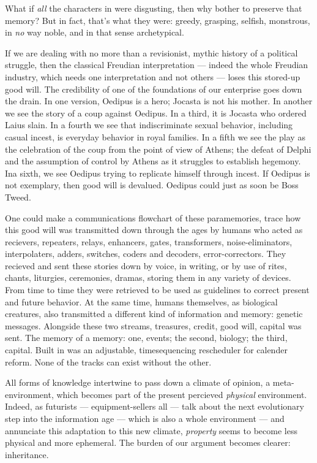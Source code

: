 What if \emph{all} the characters in  were
disgusting, then why bother to preserve that
memory? But in fact, that's what they were:
greedy, grasping, selfish, monstrous, in \emph{no}
way noble, and in that sense archetypical.

If we are dealing with no more than a
revisionist, mythic history of a political
struggle, then the classical Freudian interpretation --- indeed the whole Freudian industry, which needs one interpretation and not others --- loses this stored-up good will.
The credibility of one of the foundations of
our enterprise goes down the drain. In one
version, Oedipus is a hero; Jocasta is not his
mother. In another we see the story of a coup
against Oedipus. In a third, it is Jocasta who
ordered Laius slain. In a fourth we see that
indiscriminate sexual behavior, including
casual incest, is everyday behavior in royal
families. In a fifth we see the play as the
celebration of the coup from the point of
view of Athens; the defeat of Delphi and the
assumption of control by Athens as it struggles to establish hegemony. Ina sixth, we see
Oedipus trying to replicate himself through
incest. If Oedipus is not exemplary, then
good will is devalued. Oedipus could just as
soon be Boss Tweed.

One could make a communications flowchart of these paramemories, trace how this
good will was transmitted down through the
ages by humans who acted as recievers, repeaters, relays, enhancers, gates, transformers, noise-eliminators, interpolaters, adders,
switches, coders and decoders, error-correctors. They recieved
and sent these stories
down by voice, in writing, or by use of rites,
chants, liturgies, ceremonies, dramas, storing them in any variety of devices. From
time to time they were retrieved to be used as
guidelines to correct present and future behavior.
At the same time, humans themselves, as biological creatures, also transmitted a different kind of information and
memory: genetic messages. Alongside these two
streams, treasures, credit, good will, capital was sent. The memory of a memory:
one, events; the second, biology; the third,
capital. Built in was an adjustable, timesequencing rescheduler for calender reform.
None of the tracks can exist without the
other.

All forms of knowledge intertwine to pass
down a climate of opinion, a meta-environment, which becomes part of the present
percieved \emph{physical} environment. Indeed, as
futurists --- equipment-sellers all --- talk about
the next evolutionary step into the information age --- which is also a whole environment --- and annunciate this adaptation to this new climate, \emph{property} seems to become
less physical and more ephemeral. The
burden of our argument becomes clearer:
inheritance.

